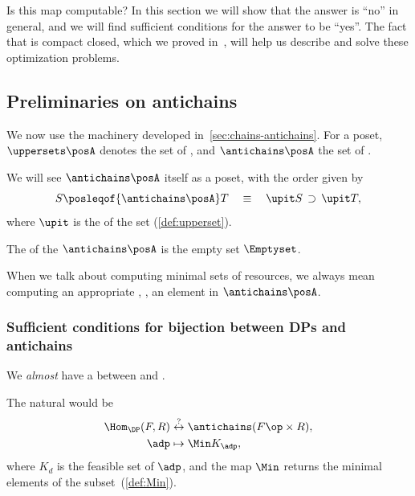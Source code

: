 Is this map computable?
In this section we will show that the answer is ``no'' in general, and we will find sufficient conditions for the answer to be ``yes''.
The fact that \DP is compact closed, which we proved in~\XXX, will help us describe and solve these optimization problems.

\subsection{Preliminaries on antichains}

We now use the  machinery developed in~\cref{sec:chains-antichains}.
For \posA a poset, $\uppersets \posA$ denotes the set of , and $\antichains \posA$ the set of .


We will see $\antichains \posA$ itself as a poset, with the order given by
\begin{equation}
    S \posleqof{\antichains \posA} T \quad \equiv \quad\upit S\, \supset\,\upit T,
\end{equation}
where $\upit$ is the  of the set (\cref{def:upperset}).

The  of the  $\antichains\posA$ is the empty set $\Emptyset$.

When we talk about computing minimal sets of resources, we always mean computing an appropriate , \ie, an element in $\antichains \posA$.

\subsubsection{Sufficient conditions for bijection between DPs and antichains }

We \emph{almost} have a  between  and .

The natural  would be
\begin{equation}
    \begin{aligned}
        \Hom_\DP(F,R) & \overset{?
        }{\leftrightarrow} \antichains (F\op \times R), \\
        \adp          & \mapsto \Min K_\adp,
    \end{aligned}
\end{equation}
where $K_d$ is the feasible set of $\adp$,
and the map $\Min$ returns the minimal elements of the subset~(\cref{def:Min}).

